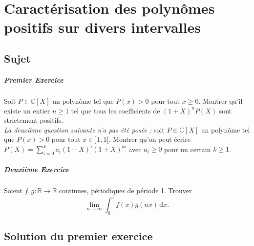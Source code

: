 \chapter[{Caractérisation des polynômes positifs}]{Caractérisation des polynômes positifs sur divers intervalles}

\section{Sujet}
\paragraph{Premier Exercice}
Soit $P \in  \mathbb{C}[X]$ un polynôme tel que $P(x) > 0$ pour tout $x \geqslant  0$. Montrer qu'il existe un entier $n \geqslant  1$ tel que tous les  coefficients de $(1 + X)^{n} P(X)$ sont strictement positifs.\\
\emph{La deuxième question suivante n'a pas été posée :} soit $P \in  \mathbb{C}[X]$ un polynôme tel que $P(x) > 0$
pour tout $x \in ]  1, 1[$. Montrer qu'on peut écrire $P(X) = \sum _{i=0} ^{k} a_{i} (1 - X)^{i} (1 + X)^{ki}$ avec $a_{i} \geqslant  0$ pour un certain $k \geqslant  1$.

\paragraph{Deuxième Exercice}
Soient $f, g : \mathbb{R} \rightarrow  \mathbb{R}$ continues, périodiques de période 1. Trouver \[\lim _{n\rightarrow \infty } \int _{0} ^{1} f(x)g(nx) \,\mathrm{d}x.\]

\section{Solution du premier exercice}
 
